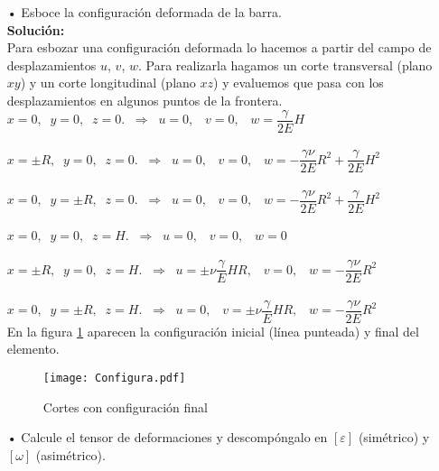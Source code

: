 \documentclass[../notas medios.tex]{subfiles}
\begin{document}
\begin{enumerate}
% 
	\item[•] Esboce la configuraci\'on deformada de la barra.\\
	
	\textbf{Solución:}\\
	
	Para esbozar una configuración deformada lo hacemos a partir del campo de desplazamientos $u$, $v$, $w$. Para realizarla  hagamos un corte transversal (plano $xy$) y un corte longitudinal (plano $xz$) y evaluemos que pasa con los desplazamientos en algunos puntos de la frontera. \\
	
$x = 0,  \;\;  y = 0,  \;\; z = 0.  \;\;   \Longrightarrow  \;\; u = 0,  \;\;\;   v = 0, \;\;\;   w = \dfrac{\gamma}{2E} H $\\\\
$x =\pm R,  \;\;  y = 0,  \;\; z = 0.  \;\;   \Longrightarrow  \;\; u = 0,  \;\;\;   v = 0, \;\;\;   w = - \dfrac{\gamma \nu}{2E} R^2 +  \dfrac{\gamma}{2E} H^2$  \\\\
$x =0,  \;\;  y = \pm R,  \;\; z = 0.  \;\;   \Longrightarrow  \;\; u = 0,  \;\;\;   v = 0, \;\;\;   w = - \dfrac{\gamma \nu}{2E} R^2 +  \dfrac{\gamma}{2E} H^2$  \\\\
$x = 0,  \;\;  y = 0,  \;\; z = H.  \;\;   \Longrightarrow  \;\; u = 0,  \;\;\;   v = 0, \;\;\;   w = 0$  \\\\
$x = \pm R,  \;\;  y = 0,  \;\; z = H.  \;\;   \Longrightarrow  \;\; u =\pm \nu \dfrac{\gamma}{E} H R,   \;\;\;   v = 0, \;\;\;   w = - \dfrac{\gamma \nu}{2E} R^2$  \\\\
$x = 0,  \;\;  y = \pm R,  \;\; z = H.  \;\;   \Longrightarrow  \;\; u =0,   \;\;\;   v = \pm \nu \dfrac{\gamma}{E} H R, \;\;\;   w = - \dfrac{\gamma \nu}{2E} R^2$  \\

En la figura \cref{ConDef} aparecen la configuración inicial (línea punteada) y final del elemento. 

\begin{figure}[h]
	\centering
	\texttt{[image: Configura.pdf]}
	\caption{Cortes con configuración final}
	 \label{ConDef}
\end{figure}
%	
	\item[•] Calcule el tensor de deformaciones y descompóngalo en $[\varepsilon]$ (sim\'etrico) y $[\omega]$ (asim\'etrico).
		

\end{enumerate}
\end{document}
